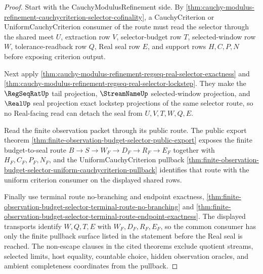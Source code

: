 \begin{proof}
Start with the CauchyModulusRefinement side. By \autoref{thm:cauchy-modulus-refinement-cauchycriterion-selector-cofinality}, a CauchyCriterion or UniformCauchyCriterion consumer of the route must read the selector through the shared meet $U$, extraction row $V$, selector-budget row $T$, selected-window row $W$, tolerance-readback row $Q$, Real seal row $E$, and support rows $H,C,P,N$ before exposing criterion output.

Next apply \autoref{thm:cauchy-modulus-refinement-regseq-real-selector-exactness} and \autoref{thm:cauchy-modulus-refinement-regseq-real-selector-lockstep}. They make the $\RegSeqRatUp$ tail projection, $\StreamNameUp$ selected-window projection, and $\RealUp$ seal projection exact lockstep projections of the same selector route, so no Real-facing read can detach the seal from $U,V,T,W,Q,E$.

Read the finite observation packet through its public route. The public export theorem \autoref{thm:finite-observation-budget-selector-public-export} exposes the finite budget-to-seal route $B \to S \to W_F \to D_F \to R_F \to E_F$ together with $H_F,C_F,P_F,N_F$, and the UniformCauchyCriterion pullback \autoref{thm:finite-observation-budget-selector-uniform-cauchycriterion-pullback} identifies that route with the uniform criterion consumer on the displayed shared rows.

Finally use terminal route no-branching and endpoint exactness, \autoref{thm:finite-observation-budget-selector-terminal-route-no-branching} and \autoref{thm:finite-observation-budget-selector-terminal-route-endpoint-exactness}. The displayed transports identify $W,Q,T,E$ with $W_F,D_F,R_F,E_F$, so the common consumer has only the finite pullback surface listed in the statement before the Real seal is reached. The non-escape clauses in the cited theorems exclude quotient streams, selected limits, host equality, countable choice, hidden observation oracles, and ambient completeness coordinates from the pullback.
\end{proof}

